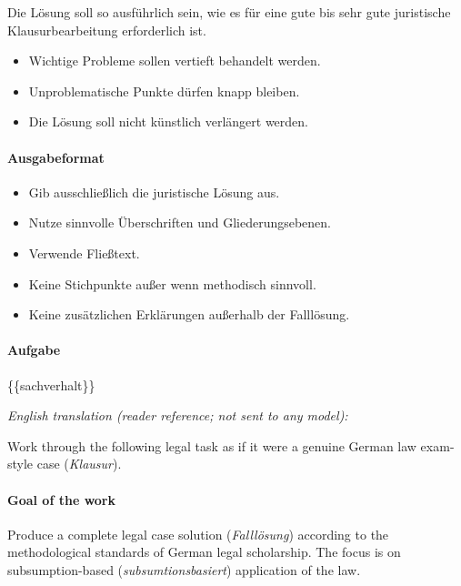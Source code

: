 \documentclass[11pt]{article}
\providecommand{\tightlist}{%
  \setlength{\itemsep}{0pt}\setlength{\parskip}{0pt}}
\begin{document}
Die Lösung soll so ausführlich sein, wie es für eine gute bis sehr gute
juristische Klausurbearbeitung erforderlich ist.

\begin{itemize}
\tightlist
\item
  Wichtige Probleme sollen vertieft behandelt werden.
\item
  Unproblematische Punkte dürfen knapp bleiben.
\item
  Die Lösung soll nicht künstlich verlängert werden.
\end{itemize}

\paragraph{\texorpdfstring{\textbf{Ausgabeformat}}{Ausgabeformat}}\label{ausgabeformat}

\begin{itemize}
\tightlist
\item
  Gib ausschließlich die juristische Lösung aus.
\item
  Nutze sinnvolle Überschriften und Gliederungsebenen.
\item
  Verwende Fließtext.
\item
  Keine Stichpunkte außer wenn methodisch sinnvoll.
\item
  Keine zusätzlichen Erklärungen außerhalb der Falllösung.
\end{itemize}

\paragraph{\texorpdfstring{\textbf{Aufgabe}}{Aufgabe}}\label{aufgabe}

\{\{sachverhalt\}\}

\emph{English translation (reader reference; not sent to any model):}

Work through the following legal task as if it were a genuine German law
exam-style case (\emph{Klausur}).

\paragraph{\texorpdfstring{\textbf{Goal of the
work}}{Goal of the work}}\label{goal-of-the-work}

Produce a complete legal case solution (\emph{Falllösung}) according to
the methodological standards of German legal scholarship. The focus is
on subsumption-based (\emph{subsumtionsbasiert}) application of the law.
\end{document}
